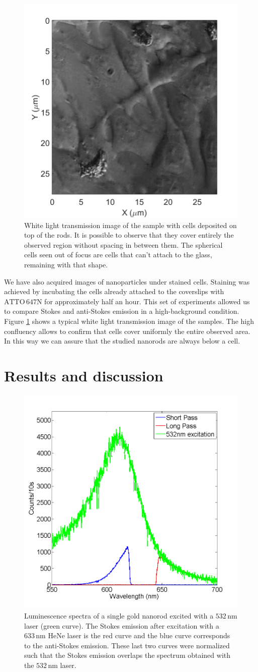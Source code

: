 \documentclass[journal=nalefd,manuscript=letter]{achemso}
\newcommand{\nm}{\ensuremath{\,\textrm{nm}}}
\newcommand{\atto}{\ensuremath{\textrm{ATTO}\,647\textrm{N}}}
\begin{document}
\begin{figure}[htp]
\centering
	\includegraphics[width=0.4\linewidth]{Figures/02_White_Light/white_light_scale.png}
	\caption{White light transmission image of the sample with cells deposited on
	top of the rods. It is possible to observe that they cover entirely the
	observed region without spacing in between them. The spherical cells seen out
	of focus are cells that can't attach to the glass, remaining with that shape.}
	\label{fig:white-light}
\end{figure}

We have also acquired images of nanoparticles under stained cells. Staining was
achieved by incubating the cells already attached to the coverslips with $\atto$
for approximately half an hour. This set of experiments allowed us to compare
Stokes and anti-Stokes emission in a high-background condition. Figure
\ref{fig:white-light} shows a typical white light transmission image of the
samples. The high confluency allows to confirm that cells cover uniformly the
entire observed area. In this way we can assure that the studied nanorods are
always below a cell.


\section{Results and discussion}

\begin{figure}[htp]
\centering
	\includegraphics[width=0.4\linewidth]{3_Curves.png}
	\caption{Luminescence spectra of a single gold nanorod excited with a $532\nm$
	laser (green curve). The Stokes emission after excitation with a $633\nm$
	HeNe laser is the red curve and the blue curve corresponds to the anti-Stokes
	emission. These last two curves were normalized such that the Stokes emission
	overlaps the spectrum obtained with the $532\nm$ laser.}
	\label{fig:spectra_rod}
\end{figure}
\end{document}
